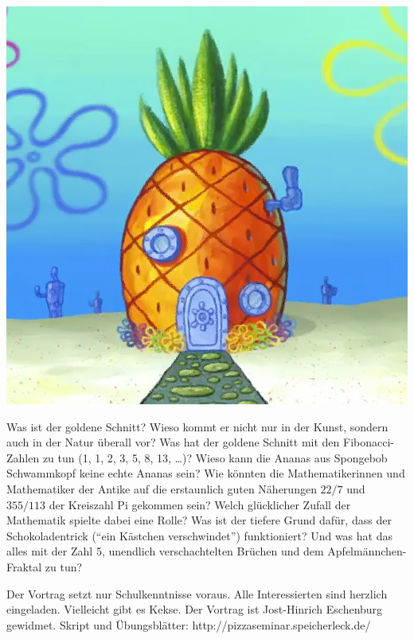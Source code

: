 \documentclass[a4paper,ngerman,landscape,12pt]{scrartcl}
\begin{document}
\begin{center}
  \includegraphics[height=0.3\textheight]{spongebob-ananas}

  \Large
  \begin{minipage}{0.72\textwidth}
    \setlength\parskip{\medskipamount}
    \vspace{0.3em}
    Was ist der goldene Schnitt? Wieso kommt er nicht nur in der Kunst, sondern
    auch in der Natur überall vor? Was hat der goldene Schnitt mit den
    Fibonacci-Zahlen zu tun (1, 1, 2, 3, 5, 8, 13, \ldots)? Wieso kann die Ananas
    aus Spongebob Schwammkopf keine echte Ananas sein? Wie könnten die
    Mathematikerinnen und Mathematiker der Antike auf die erstaunlich guten
    Näherungen $22/7$ und $355/113$ der Kreiszahl Pi gekommen sein? Welch
    glücklicher Zufall der Mathematik spielte dabei eine Rolle? Was ist der
    tiefere Grund dafür, dass der Schokoladentrick ("`ein Kästchen
    verschwindet"') funktioniert? Und was hat das alles mit der Zahl 5,
    unendlich verschachtelten Brüchen und dem Apfelmännchen-Fraktal zu tun?

    Der Vortrag setzt nur Schulkenntnisse voraus. Alle Interessierten sind
    herzlich eingeladen. Vielleicht gibt es Kekse. Der Vortrag ist Jost-Hinrich
    Eschenburg gewidmet.
    \vspace{0.3em}
    {\hfill\small Skript und Übungsblätter:
    \textsf{http:/$\!$/pizzaseminar.speicherleck.de/}}
  \end{minipage}
\end{center}
\end{document}
